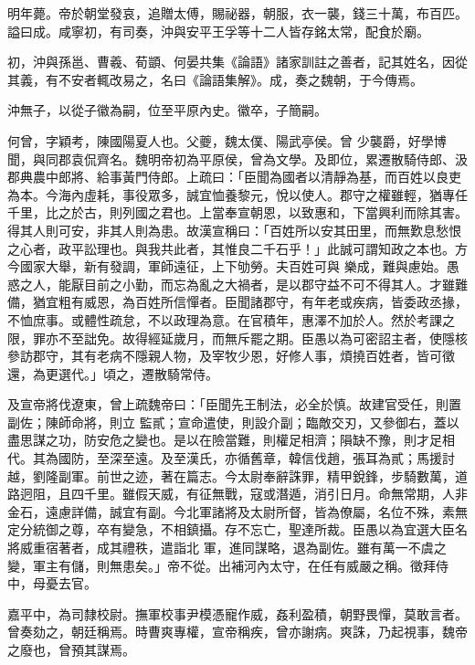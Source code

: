 \begin{pinyinscope}
 明年薨。帝於朝堂發哀，追贈太傅，賜祕器，朝服，衣一襲，錢三十萬，布百匹。謚曰成。咸寧初，有司奏，沖與安平王孚等十二人皆存銘太常，配食於廟。



 初，沖與孫邕、曹羲、荀顗、何晏共集《論語》諸家訓註之善者，記其姓名，因從其義，有不安者輒改易之，名曰《論語集解》。成，奏之魏朝，于今傳焉。



 沖無子，以從子徽為嗣，位至平原內史。徽卒，子簡嗣。



 何曾，字穎考，陳國陽夏人也。父夔，魏太僕、陽武亭侯。曾
 少襲爵，好學博聞，與同郡袁侃齊名。魏明帝初為平原侯，曾為文學。及即位，累遷散騎侍郎、汲郡典農中郎將、給事黃門侍郎。上疏曰：「臣聞為國者以清靜為基，而百姓以良吏為本。今海內虛耗，事役眾多，誠宜恤養黎元，悅以使人。郡守之權雖輕，猶專任千里，比之於古，則列國之君也。上當奉宣朝恩，以致惠和，下當興利而除其害。得其人則可安，非其人則為患。故漢宣稱曰：「百姓所以安其田里，而無歎息愁恨之心者，政平訟理也。與我共此者，其惟良二千石乎！」此誠可謂知政之本也。方今國家大舉，新有發調，軍師遠征，上下劬勞。夫百姓可與
 樂成，難與慮始。愚惑之人，能厭目前之小勤，而忘為亂之大禍者，是以郡守益不可不得其人。才雖難備，猶宜粗有威恩，為百姓所信憚者。臣聞諸郡守，有年老或疾病，皆委政丞掾，不恤庶事。或體性疏怠，不以政理為意。在官積年，惠澤不加於人。然於考課之限，罪亦不至詘免。故得經延歲月，而無斥罷之期。臣愚以為可密詔主者，使隱核參訪郡守，其有老病不隱親人物，及宰牧少恩，好修人事，煩撓百姓者，皆可徵還，為更選代。」頃之，遷散騎常侍。



 及宣帝將伐遼東，曾上疏魏帝曰：「臣聞先王制法，必全於慎。故建官受任，則置副佐；陳師命將，則立
 監貳；宣命遣使，則設介副；臨敵交刃，又參御右，蓋以盡思謀之功，防安危之變也。是以在險當難，則權足相濟；隕缺不豫，則才足相代。其為國防，至深至遠。及至漢氏，亦循舊章，韓信伐趙，張耳為貳；馬援討越，劉隆副軍。前世之迹，著在篇志。今太尉奉辭誅罪，精甲銳鋒，步騎數萬，道路迥阻，且四千里。雖假天威，有征無戰，寇或潛遁，消引日月。命無常期，人非金石，遠慮詳備，誠宜有副。今北軍諸將及太尉所督，皆為僚屬，名位不殊，素無定分統御之尊，卒有變急，不相鎮攝。存不忘亡，聖達所裁。臣愚以為宜選大臣名將威重宿著者，成其禮秩，遣詣北
 軍，進同謀略，退為副佐。雖有萬一不虞之變，軍主有儲，則無患矣。」帝不從。出補河內太守，在任有威嚴之稱。徵拜侍中，母憂去官。



 嘉平中，為司隸校尉。撫軍校事尹模憑寵作威，姦利盈積，朝野畏憚，莫敢言者。曾奏劾之，朝廷稱焉。時曹爽專權，宣帝稱疾，曾亦謝病。爽誅，乃起視事，魏帝之廢也，曾預其謀焉。




\end{pinyinscope}

